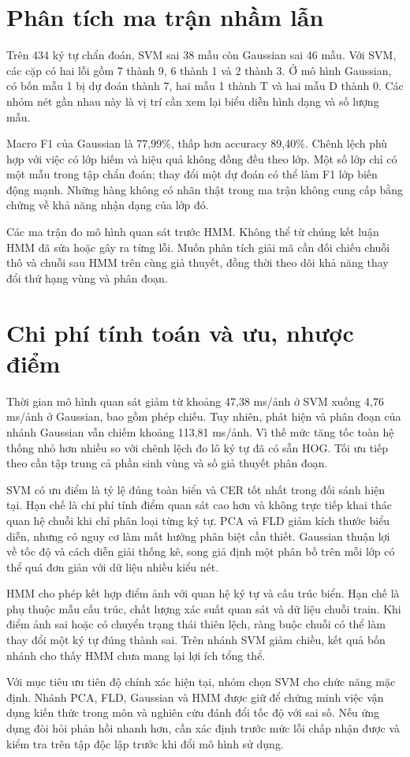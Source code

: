 \section{Phân tích ma trận nhầm lẫn}
Trên 434 ký tự chẩn đoán, SVM sai 38 mẫu còn Gaussian sai 46 mẫu. Với SVM, các cặp có hai lỗi gồm 7 thành 9, 6 thành 1 và 2 thành 3. Ở mô hình Gaussian, có bốn mẫu 1 bị dự đoán thành 7, hai mẫu 1 thành T và hai mẫu D thành 0. Các nhóm nét gần nhau này là vị trí cần xem lại biểu diễn hình dạng và số lượng mẫu.

Macro F1 của Gaussian là 77,99\%, thấp hơn accuracy 89,40\%. Chênh lệch phù hợp với việc có lớp hiếm và hiệu quả không đồng đều theo lớp. Một số lớp chỉ có một mẫu trong tập chẩn đoán; thay đổi một dự đoán có thể làm F1 lớp biến động mạnh. Những hàng không có nhãn thật trong ma trận không cung cấp bằng chứng về khả năng nhận dạng của lớp đó.

Các ma trận đo mô hình quan sát trước HMM. Không thể từ chúng kết luận HMM đã sửa hoặc gây ra từng lỗi. Muốn phân tích giải mã cần đối chiếu chuỗi thô và chuỗi sau HMM trên cùng giả thuyết, đồng thời theo dõi khả năng thay đổi thứ hạng vùng và phân đoạn.

\section{Chi phí tính toán và ưu, nhược điểm}

Thời gian mô hình quan sát giảm từ khoảng 47,38 ms/ảnh ở SVM xuống 4,76 ms/ảnh ở Gaussian, bao gồm phép chiếu. Tuy nhiên, phát hiện và phân đoạn của nhánh Gaussian vẫn chiếm khoảng 113,81 ms/ảnh. Vì thế mức tăng tốc toàn hệ thống nhỏ hơn nhiều so với chênh lệch đo lô ký tự đã có sẵn HOG. Tối ưu tiếp theo cần tập trung cả phần sinh vùng và số giả thuyết phân đoạn.

SVM có ưu điểm là tỷ lệ đúng toàn biển và CER tốt nhất trong đối sánh hiện tại. Hạn chế là chi phí tính điểm quan sát cao hơn và không trực tiếp khai thác quan hệ chuỗi khi chỉ phân loại từng ký tự. PCA và FLD giảm kích thước biểu diễn, nhưng có nguy cơ làm mất hướng phân biệt cần thiết. Gaussian thuận lợi về tốc độ và cách diễn giải thống kê, song giả định một phân bố trên mỗi lớp có thể quá đơn giản với dữ liệu nhiều kiểu nét.

HMM cho phép kết hợp điểm ảnh với quan hệ ký tự và cấu trúc biển. Hạn chế là phụ thuộc mẫu cấu trúc, chất lượng xác suất quan sát và dữ liệu chuỗi train. Khi điểm ảnh sai hoặc có chuyển trạng thái thiên lệch, ràng buộc chuỗi có thể làm thay đổi một ký tự đúng thành sai. Trên nhánh SVM giảm chiều, kết quả bốn nhánh cho thấy HMM chưa mang lại lợi ích tổng thể.

Với mục tiêu ưu tiên độ chính xác hiện tại, nhóm chọn SVM cho chức năng mặc định. Nhánh PCA, FLD, Gaussian và HMM được giữ để chứng minh việc vận dụng kiến thức trong môn và nghiên cứu đánh đổi tốc độ với sai số. Nếu ứng dụng đòi hỏi phản hồi nhanh hơn, cần xác định trước mức lỗi chấp nhận được và kiểm tra trên tập độc lập trước khi đổi mô hình sử dụng.

